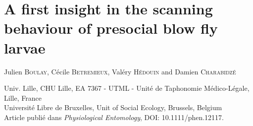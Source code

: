 
\chapter{A first insight in the scanning behaviour of presocial blow fly larvae} %

\label{Chapter3} %


Julien \textsc{Boulay}, Cécile \textsc{Betremieux}, Valéry \textsc{Hédouin} and Damien \textsc{Charabidzé}

 Univ. Lille, CHU Lille, EA 7367 - UTML - Unité de Taphonomie Médico-Légale, Lille, France\\
 Université Libre de Bruxelles, Unit of Social Ecology, Brussels, Belgium\\


Article publié dans \emph{Physiological Entomology}, DOI: 10.1111/phen.12117.\\


\cleardoublepage


